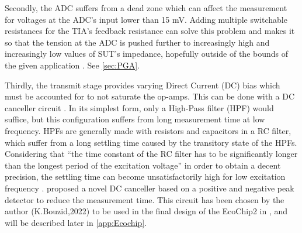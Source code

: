 Secondly, the ADC suffers from a dead zone which can affect the measurement for voltages at the ADC’s input lower than 15 mV. Adding multiple switchable resistances for the TIA’s feedback resistance can solve this problem and makes it so that the tension at the ADC is pushed further to increasingly high and increasingly low values of SUT’s impedance, hopefully outside of the bounds of the given application \cite{Chabowski2015,horowitz1989art}. See \autoref{sec:PGA}. \par

Thirdly, the transmit stage provides varying Direct Current (DC) bias which must be accounted for to not saturate the op-amps. This can be done with a DC canceller circuit \cite{horowitz1989art}. In its simplest form, only a High-Pass filter (HPF) would suffice, but this configuration suffers from long measurement time at low frequency. HPFs are generally made with resistors and capacitors in a RC filter, which suffer from a long settling time caused by the transitory state of the HPFs. Considering that “the time constant of the RC filter has to be significantly longer than the longest period of the excitation voltage”\cite{Chabowski2015} in order to obtain a decent precision, the settling time can become unsatisfactorily high for low excitation frequency \cite{horowitz1989art}. \citep{Chabowski2015} proposed a novel DC canceller based on a positive and negative peak detector to reduce the measurement time. This circuit has been chosen by the author (K.Bouzid,2022) to be used in the final design of the EcoChip2 in \citep{das2020ecochip}, and will be described later in \autoref{app:Ecochip}. \par

